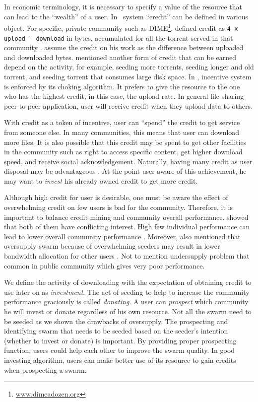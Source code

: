 In economic terminology, it is necessary to specify a value of the resource that can lead to the ``wealth'' of a user. In \bt~system ``credit'' can be defined in various object. For specific, private community such as DIME\footnote{\url{www.dimeadozen.org}}, \citeauthor{2012:economicbt:kash}  defined credit as \texttt{4 x upload - download} in bytes, accumulated for all the torrent served in that community \cite{2012:economicbt:kash}. \citeauthor{2015:creditmining:capota} assume the credit on his work as the difference between uploaded and downloaded bytes. \citeauthor{2014:sustainabilitytorrent:chen} mentioned another form of credit that can be earned depend on the activity, for example, seeding more torrents, seeding longer and old torrent, and seeding torrent that consumes large disk space\cite{2014:sustainabilitytorrent:chen}. In \bt, incentive system is enforced by its choking algorithm. It prefers to give the resource to the one who has the highest credit, in this case, the upload rate. In general file-sharing peer-to-peer application, user will receive credit when they upload data to others.

With credit as a token of incentive, user can ``spend'' the credit to get service from someone else. In many communities, this means that user can download more files. It is also possible that this credit may be spent to get other facilities in the community such as right to access specific content, get higher download speed, and receive social acknowledgement. Naturally, having many credit as user disposal may be advantageous \cite{2014:sustainabilitytorrent:chen}. At the point user aware of this achievement, he may want to \textit{invest} his already owned credit to get more credit.

Although high credit for user is desirable, one must be aware the effect of overwhelming credit on few users is bad for the community. Therefore, it is important to balance credit mining and community overall performance. \citeauthor{2015:sustainabilitypt:vinko} showed that both of them have conflicting interest. High few individual performance can lead to lower overall community performance \cite{2015:sustainabilitypt:vinko}. Moreover, \citeauthor{2013:survivepriv:jia} also mentioned that oversupply swarm because of overwhelming seeders may result in lower bandwidth allocation for other users \cite{2013:survivepriv:jia}. Not to mention undersupply problem that common in public community which gives very poor performance.

We define the activity of downloading with the expectation of obtaining credit to use later on as \textit{investment}. The act of seeding to help to increase the community performance graciously is called \textit{donating}. A user can \textit{prospect} which community he will invest or donate regardless of his own resource. Not all the swarm need to be seeded as we shown the drawbacks of oversupply. The prospecting and identifying swarm that needs to be seeded based on the seeder's intention (whether to invest or donate) is important. By providing proper prospecting function, users could help each other to improve the swarm quality. In good investing algorithm, users can make better use of its resource to gain credits when prospecting a swarm. 

